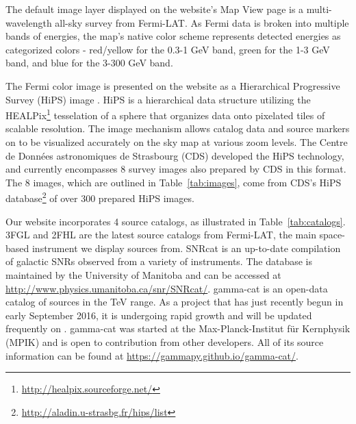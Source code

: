 %

The default image layer displayed on the website's Map View page is a multi-wavelength all-sky survey from Fermi-LAT. As Fermi data is broken into multiple bands of energies, the map's native color scheme represents detected energies as categorized colors - red/yellow for the 0.3-1 GeV band, green for the 1-3 GeV band, and blue for the 3-300 GeV band.

 The Fermi color image is presented on the website as a Hierarchical Progressive Survey (HiPS) image \cite{hips}. HiPS is a hierarchical data structure utilizing the HEALPix\footnote[4]{\url{http://healpix.sourceforge.net/}} tesselation of a sphere that organizes data onto pixelated tiles of scalable resolution. The image mechanism allows catalog data and source markers on \gammasky to be visualized accurately on the sky map at various zoom levels. The Centre de Donn\'{e}es astronomiques de Strasbourg (CDS) developed the HiPS technology, and \gammasky currently encompasses 8 survey images also prepared by CDS in this format. The 8 images, which are outlined in Table~\ref{tab:images}, come from CDS's HiPS database\footnote[5]{\url{http://aladin.u-strasbg.fr/hips/list}} of over 300 prepared HiPS images.

Our website incorporates 4 source catalogs, as illustrated in Table~\ref{tab:catalogs}. 3FGL \cite{3fgl} and 2FHL \cite{2fhl} are the latest source catalogs from Fermi-LAT, the main space-based instrument we display sources from. SNRcat \cite{snrcat} is an up-to-date compilation of galactic SNRs observed from a variety of instruments. The database is maintained by the University of Manitoba and can be accessed at \url{http://www.physics.umanitoba.ca/snr/SNRcat/}. gamma-cat is an open-data catalog of sources in the TeV range. As a project that has just recently begun in early September 2016, it is undergoing rapid growth and will be updated frequently on \gammasky. gamma-cat was started at the Max-Planck-Institut f\"{u}r Kernphysik (MPIK) and is open to contribution from other developers. All of its source information can be found at \url{https://gammapy.github.io/gamma-cat/}.

